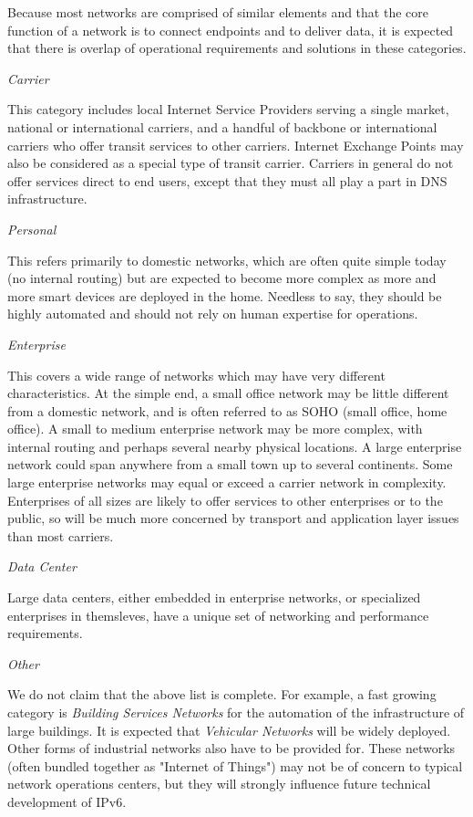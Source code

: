 \documentclass[
]{article}
\begin{document}
Because most networks are comprised of similar elements and that the
core function of a network is to connect endpoints and to deliver data,
it is expected that there is overlap of operational requirements and
solutions in these categories.

\emph{Carrier}

This category includes local Internet Service Providers serving a single
market, national or international carriers, and a handful of backbone or
international carriers who offer transit services to other carriers.
Internet Exchange Points may also be considered as a special type of
transit carrier. Carriers in general do not offer services direct to end
users, except that they must all play a part in DNS infrastructure.

\emph{Personal}

This refers primarily to domestic networks, which are often quite simple
today (no internal routing) but are expected to become more complex as
more and more smart devices are deployed in the home. Needless to say,
they should be highly automated and should not rely on human expertise
for operations.

\emph{Enterprise}

This covers a wide range of networks which may have very different
characteristics. At the simple end, a small office network may be little
different from a domestic network, and is often referred to as SOHO
(small office, home office). A small to medium enterprise network may be
more complex, with internal routing and perhaps several nearby physical
locations. A large enterprise network could span anywhere from a small
town up to several continents. Some large enterprise networks may equal
or exceed a carrier network in complexity. Enterprises of all sizes are
likely to offer services to other enterprises or to the public, so will
be much more concerned by transport and application layer issues than
most carriers.

\emph{Data Center}

Large data centers, either embedded in enterprise networks, or
specialized enterprises in themsleves, have a unique set of networking
and performance requirements.

\emph{Other}

We do not claim that the above list is complete. For example, a fast
growing category is \emph{Building Services Networks} for the automation
of the infrastructure of large buildings. It is expected that
\emph{Vehicular Networks} will be widely deployed. Other forms of
industrial networks also have to be provided for. These networks (often
bundled together as "Internet of Things") may not be of concern to
typical network operations centers, but they will strongly influence
future technical development of IPv6.
\end{document}

